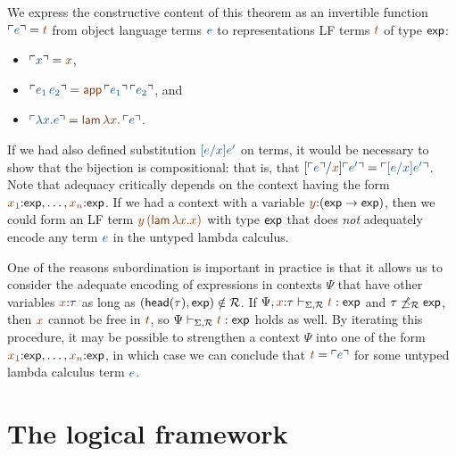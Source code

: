 We express the constructive content of this theorem as an invertible
function $\interp{e} = \lf{t}$ from object language terms $\obj{e}$ to
representations LF terms $\lf{t}$ of type ${\sf exp}$:
\smallskip
\begin{itemize}
\item $\interp{x} = \lf{x}$, 
\item $\interp{e_1\,e_2} = \lf{{\sf
    app}\,\interp{e_1}\,\interp{e_2}}$, and
\item  $\interp{\lambda x.e} =
\lf{{\sf lam}\,\lambda x.\,\interp{e}}$.
\end{itemize}
\smallskip If we had also defined
substitution $\obj{[e/x]e'}$ on terms, it would be necessary to show
that the bijection is compositional: that is, that
$[\interp{e}/\lf{x}]\interp{e'} = \interp{[e/x]e'}$.  Note that
adequacy critically depends on the context having the form
$\lf{x_1}{:}{\sf exp},\ldots,\lf{x_n}{:}{\sf exp}$. If we had a
context with a variable $\lf{y}{:}({\sf exp} \rightarrow {\sf exp})$,
then we could form an LF term $\lf{y\,({\sf lam}\,\lambda x. x)}$ with
type ${\sf exp}$ that does {\it not} adequately encode any term
$\obj{e}$ in the untyped lambda calculus.

One of the reasons subordination is important in practice is that it
allows us to consider the adequate encoding of expressions in contexts
$\Psi$ that have other variables $\lf{x}{:}\tau$ as long as $({\sf
  head}(\tau),{\sf exp}) \notin \mathcal R$. If $\Psi,\lf{x}{:}\tau
\vdash_{\Sigma,\subord} \lf{t} : {\sf exp}$ and $\tau
\not\preceq_\mathcal R {\sf exp}$, then $\lf{x}$ cannot be free in
$\lf{t}$, so $\Psi \vdash_{\Sigma,\subord} \lf{t} : {\sf exp}$ holds as
well. By iterating this procedure, it may be possible to strengthen a
context $\Psi$ into one of the form $\lf{x_1}{:}{\sf
  exp},\ldots,\lf{x_n}{:}{\sf exp}$, in which case we can conclude
that $\lf t = \interp{e}$ for some untyped lambda calculus term $\obj
e$.



\section{The logical framework \sls}
\label{sec:slsframework}

